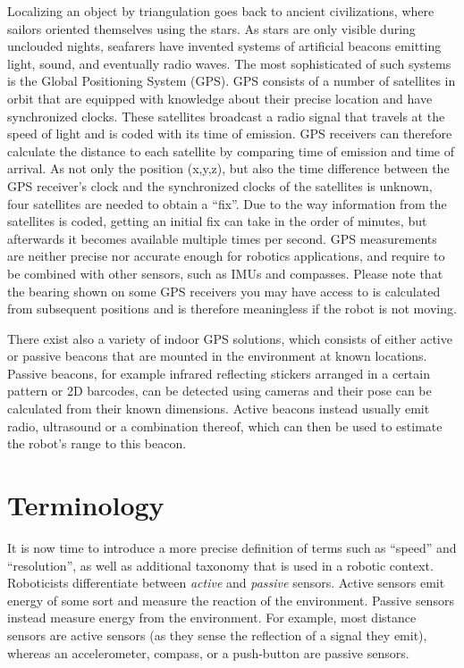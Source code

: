 Localizing an object by triangulation goes back to ancient civilizations, where sailors oriented themselves using the stars. As stars are only visible during unclouded nights, seafarers have invented systems of artificial beacons emitting light, sound, and eventually radio waves. The most sophisticated of such systems is the Global Positioning System (GPS). GPS consists of a number of satellites in orbit that are equipped with knowledge about their precise location and have synchronized clocks. These satellites broadcast a radio signal that travels at the speed of light and is coded with its time of emission. GPS receivers can therefore calculate the distance to each satellite by comparing time of emission and time of arrival. As not only the position (x,y,z), but also the time difference between the GPS receiver's clock and the synchronized clocks of the satellites is unknown, four satellites are needed to obtain a ``fix''. Due to the way information from the satellites is coded, getting an initial fix can take in the order of minutes, but afterwards it becomes available multiple times per second. GPS measurements are neither precise nor accurate enough for robotics applications, and require to be combined with other sensors, such as IMUs and compasses. Please note that the bearing shown on some GPS receivers you may have access to is calculated from subsequent positions and is therefore meaningless if the robot is not moving.

There exist also a variety of indoor GPS solutions, which consists of either active or passive beacons that are mounted in the environment at known locations. Passive beacons, for example infrared reflecting stickers arranged in a certain pattern or 2D barcodes, can be detected using cameras and their pose can be calculated from their known dimensions. Active beacons instead usually emit radio, ultrasound or a combination thereof, which can then be used to estimate the robot's range to this beacon.

\section{Terminology}
It is now time to introduce a more precise definition of terms such as ``speed'' and ``resolution'', as well as additional taxonomy that is used in a robotic context.
%
Roboticists differentiate between \textsl{active} and \textsl{passive} sensors. Active sensors  emit energy of some sort and measure the reaction of the environment. Passive sensors  instead measure energy from the environment. For example, most distance sensors are active sensors (as they sense the reflection of a signal they emit), whereas an accelerometer, compass, or a push-button are passive sensors.

